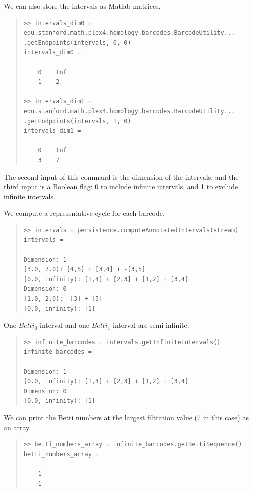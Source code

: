 \documentclass[amscd, amssymb, verbatim]{amsart}[12pt]
\theoremstyle{remark}
\theoremstyle{remark}
\theoremstyle{remark}
\begin{document}
We can also store the intervals as Matlab matrices.

\begin{quote} \begin{verbatim}
>> intervals_dim0 = edu.stanford.math.plex4.homology.barcodes.BarcodeUtility...
.getEndpoints(intervals, 0, 0)
intervals_dim0 =

    0    Inf
    1    2
    
>> intervals_dim1 = edu.stanford.math.plex4.homology.barcodes.BarcodeUtility...
.getEndpoints(intervals, 1, 0)
intervals_dim1 =

    0    Inf
    3    7
\end{verbatim} \end{quote}

The second input of this command is the dimension of the intervals, and the third input is a Boolean flag: 0 to include infinite intervals, and 1 to exclude infinite intervals.

We compute a representative cycle for each barcode.

\begin{quote} \begin{verbatim}
>> intervals = persistence.computeAnnotatedIntervals(stream)
intervals =

Dimension: 1
[3.0, 7.0): [4,5] + [3,4] + -[3,5]
[0.0, infinity): [1,4] + [2,3] + [1,2] + [3,4]
Dimension: 0
[1.0, 2.0): -[3] + [5]
[0.0, infinity): [1]
\end{verbatim} \end{quote}

One $Betti_0$ interval and one $Betti_1$ interval are semi-infinite. 
\begin{quote} \begin{verbatim}
>> infinite_barcodes = intervals.getInfiniteIntervals()
infinite_barcodes = 

Dimension: 1
[0.0, infinity): [1,4] + [2,3] + [1,2] + [3,4]
Dimension: 0
[0.0, infinity): [1]
\end{verbatim} \end{quote}

We can print the Betti numbers at the largest filtration value (7 in this case) as an array

\begin{quote} \begin{verbatim}
>> betti_numbers_array = infinite_barcodes.getBettiSequence()
betti_numbers_array =

    1
    1
\end{verbatim} \end{quote}
\end{document}
